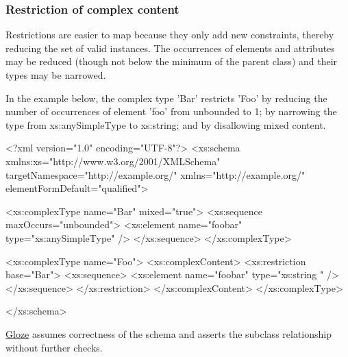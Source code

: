 \hypertarget{restrictionComplexContent}{}\subsubsection{Restriction of complex content}\label{restrictionComplexContent}
Restrictions are easier to map because they only add new constraints, thereby reducing the set of valid instances. The occurrences of elements and attributes may be reduced (though not below the minimum of the parent class) and their types may be narrowed.

In the example below, the complex type 'Bar' restricts 'Foo' by reducing the number of occurrences of element 'foo' from unbounded to 1; by narrowing the type from xs:anySimpleType to xs:string; and by disallowing mixed content.


\begin{DoxyCodeInclude}
<?xml version="1.0" encoding="UTF-8"?>
<xs:schema xmlns:xs="http://www.w3.org/2001/XMLSchema" 
        targetNamespace="http://example.org/" xmlns="http://example.org/"
        elementFormDefault="qualified">
        
        <xs:complexType name="Bar" mixed="true">
                <xs:sequence maxOccurs="unbounded">
                        <xs:element name="foobar" type="xs:anySimpleType" />
                </xs:sequence>
        </xs:complexType>
        
        <xs:complexType name="Foo">
                <xs:complexContent>
                        <xs:restriction base="Bar">
                                <xs:sequence>
                                        <xs:element name="foobar" type="xs:string
      " />
                                </xs:sequence>
                        </xs:restriction>
                </xs:complexContent>
        </xs:complexType>

</xs:schema>
\end{DoxyCodeInclude}


\hyperlink{classcom_1_1hp_1_1gloze_1_1_gloze}{Gloze} assumes correctness of the schema and asserts the subclass relationship without further checks.


